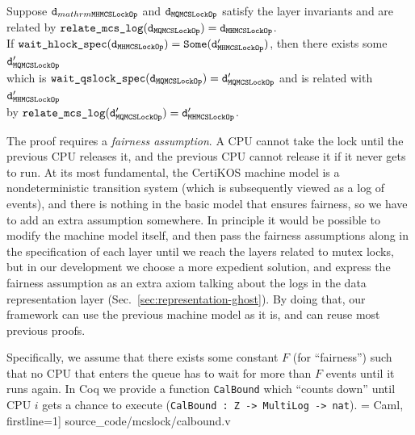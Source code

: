 \begin{theorem}
  \label{thm:mcs_wait_lock_exist}
  Suppose $\mathrm{\texttt{d}}_{\scriptsize\\mathrm{\texttt{MHMCSLockOp}}}$ and $\mathrm{\texttt{d}}_{\scriptsize\mathrm{\texttt{MQMCSLockOp}}}$ satisfy the layer
  invariants and are related by $\mathrm{\texttt{relate\_mcs\_log}}(\mathrm{\texttt{d}}_{\scriptsize\mathrm{\texttt{{MQMCSLockOp}}}}) = 
  \mathrm{\texttt{d}}_{\scriptsize\mathrm{\texttt{MHMCSLockOp}}}$. \\
If $\mathrm{\texttt{wait\_hlock\_spec}}(\mathrm{\texttt{d}}_{\scriptsize\mathrm{\texttt{MHMCSLockOp}}}) = \mathrm{\texttt{Some}}(\mathrm{\texttt{d}}'_{\scriptsize\mathrm{\texttt{MHMCSLockOp}}})$, then there exists some $\mathrm{\texttt{d}}'_{\scriptsize\mathrm{\texttt{MQMCSLockOp}}}$\\
  which is $\mathrm{\texttt{wait\_qslock\_spec}}(\mathrm{\texttt{d}}_{\scriptsize\mathrm{\texttt{MQMCSLockOp}}}) = \mathrm{\texttt{d}}'_{\scriptsize\mathrm{\texttt{MQMCSLockOp}}}$ and is related with $\mathrm{\texttt{d}}'_{\scriptsize\mathrm{\texttt{MHMCSLockOp}}}$\\
   by $\mathrm{\texttt{relate\_mcs\_log}}(\mathrm{\texttt{d}}'_{\scriptsize\mathrm{\texttt{MQMCSLockOp}}}) = \mathrm{\texttt{d}}'_{\scriptsize\mathrm{\texttt{MHMCSLockOp}}}$.
\end{theorem}

The proof  requires a \emph{fairness assumption}.
A CPU cannot take the lock until the previous CPU releases it, 
and the previous CPU cannot release it if it never gets to run. 
At its most fundamental, the CertiKOS machine model is a nondeterministic 
transition system (which is subsequently viewed as a log of events), 
and there is nothing in the basic model that ensures fairness, 
so we have to add an extra assumption somewhere. In principle it would be 
possible to modify the machine model itself, and then pass the fairness assumptions 
along in the specification of each layer until we reach the layers related to mutex locks, 
but in our development we choose a more expedient solution, and express
the fairness assumption as an extra axiom talking about the logs 
in the data representation layer (Sec.~\ref{sec:representation-ghost}). 
By doing that, our framework can use the previous machine 
model as it is, and can reuse most previous proofs.

Specifically, we assume that there exists some constant $F$ (for ``fairness'') such that no CPU that enters the queue has to wait for more than $F$ events until it runs again. 
In Coq we provide a function \lstinline$CalBound$ which ``counts down'' 
until CPU $i$ gets a chance to 
execute (\lstinline$CalBound : Z -> MultiLog -> nat$).
 = Caml, firstline=1] {source_code/mcslock/calbound.v}

